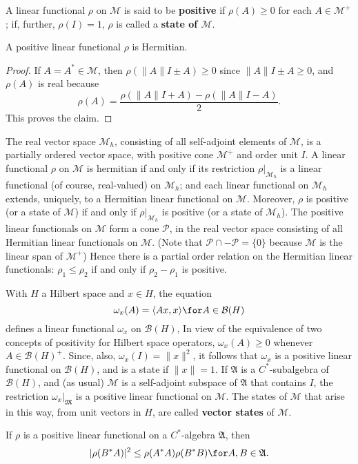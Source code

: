 A linear functional $\rho$ on $\mathscr{M}$ is said to be \textbf{positive} if $\rho(A)\geq 0$ for each $A\in\mathscr{M}^+$; if, further, $\rho(I)=1$, $\rho$ is called a \textbf{state of $\mathscr{M}$}.
\begin{proposition}
A positive linear functional $\rho$ is Hermitian.
\end{proposition}
\begin{proof}
If $A=A^*\in\mathscr{M}$, then $\rho(\|A\|I\pm A)\geq 0$ since $\|A\|I\pm A\geq 0$, and $\rho(A)$ is real because
\[\rho(A)=\frac{\rho(\|A\|I+A)-\rho(\|A\|I-A)}{2}.\]
This proves the claim.
\end{proof}
The real vector space $\mathscr{M}_h$, consisting of all self-adjoint elements of $\mathscr{M}$, is a partially ordered vector space, with positive cone $\mathscr{M}^+$ and order unit $I$. A linear functional $\rho$ on $\mathscr{M}$ is hermitian if and only if its restriction $\rho|_{\mathscr{M}_h}$ is a linear functional (of course, real-valued) on $\mathscr{M}_h$; and each linear functional on $\mathscr{M}_h$ extends, uniquely, to a Hermitian linear functional on $\mathscr{M}$. Moreover, $\rho$ is positive (or a state of $\mathscr{M}$) if and only if $\rho|_{\mathscr{M}_h}$ is positive (or a state of $\mathscr{M}_h$). The positive linear functionals on $\mathscr{M}$ form a cone $\mathcal{P}$, in the real vector space consisting of all Hermitian linear functionals on $\mathscr{M}$. (Note that $\mathcal{P}\cap-\mathcal{P}=\{0\}$ because $\mathscr{M}$ is the linear span of $\mathscr{M}^+$) Hence there is a partial order relation on the Hermitian linear functionals: $\rho_1\leq\rho_2$ if and only if $\rho_2-\rho_1$ is positive.\par
With $H$ a Hilbert space and $x\in H$, the equation
\[\omega_x(A)=\langle Ax,x\rangle\for A\in\mathcal{B}(H)\]
defines a linear functional $\omega_x$ on $\mathcal{B}(H)$, In view of the equivalence of two concepts of positivity for Hilbert space operators, $\omega_x(A)\geq 0$ whenever $A\in\mathcal{B}(H)^+$. Since, also, $\omega_x(I)=\|x\|^2$, it follows that $\omega_x$ is a positive linear functional on $\mathcal{B}(H)$, and is a state if $\|x\|=1$. If $\mathfrak{A}$ is a $C^*$-subalgebra of $\mathcal{B}(H)$, and (as usual) $\mathscr{M}$ is a self-adjoint subspace of $\mathfrak{A}$ that contains $I$, the restriction $\omega_x|_{\mathfrak{M}}$ is a positive linear functional on $\mathscr{M}$. The states of $\mathscr{M}$ that arise in this way, from unit vectors in $H$, are called \textbf{vector states} of $\mathscr{M}$.
\begin{proposition}\label{C^* algebra positive functional inequality}
If $\rho$ is a positive linear functional on a $C^*$-algebra $\mathfrak{A}$, then
\[|\rho(B^*A)|^2\leq\rho(A^*A)\rho(B^*B)\for A,B\in\mathfrak{A}.\]
\end{proposition}
